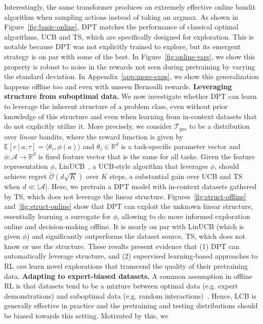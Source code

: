 \documentclass{article}
\newcommand{\Acal}{\mathcal{A}}
\newcommand{\Ocal}{\mathcal{O}}
\newcommand{\Tcal}{{\mathcal{T}}}
\newcommand{\E}{\mathbb{E}}
\newcommand{\RR}{\mathbb{R}}
\newcommand{\dotp}[2]{\langle{#1},{#2}\rangle}
\newcommand{\pretraint}{\Tcal_{\text{pre}}}
\newcommand{\macroName}{DPT}
\begin{document}
Interestingly, the same transformer produces an extremely effective online bandit algorithm when sampling actions instead of taking an argmax. As shown in Figure~\ref{fig:basic-online}, DPT matches the performance of classical optimal algorithms, UCB and TS, which are specifically designed for exploration. This is notable because \macroName{} was not explicitly trained to explore, but its emergent strategy is on par with some of the best.  In Figure~\ref{fig:online-vars}, we show this property is robust to noise in the rewards not seen during pretraining by varying the standard deviation. In Appendix~\ref{app:more-exps}, we show this generalization happens offline too and even with unseen Bernoulli rewards.
\textbf{Leveraging structure from suboptimal data.} We now investigate whether \macroName{} can learn to leverage the inherent structure of a problem class, even without prior knowledge of this structure and even when learning from in-context datasets that do not explicitly utilize it. More precisely, we consider $\pretraint$ to be a distribution over \emph{linear} bandits, where the reward function is given by $\E\left[r \ | \ a, \tau \right] =  \dotp{\theta_\tau}{\phi(a)}$ and $\theta_\tau \in \RR^d$ is a task-specific parameter vector and $\phi: \Acal \to \RR^d$ is fixed feature vector that is the same for all tasks.
Given the feature representation $\phi$, LinUCB~\citep{abbasi2011improved}, a UCB-style algorithm that leverages $\phi$, should achieve regret $\widetilde{\Ocal}(d\sqrt{ K})$ over $K$ steps, a substantial gain over UCB and TS when $d \ll |\Acal|$.
Here, we pretrain a \macroName{} model with in-context datasets gathered by TS, which does not leverage the linear structure. Figures~\ref{fig:struct-offline} and~\ref{fig:struct-online} show that \macroName{} can exploit the unknown linear structure, essentially learning a surrogate for $\phi$, allowing to do more informed exploration online and decision-making offline.
It is nearly on par with LinUCB (which is given $\phi$) and significantly outperforms the dataset source, TS, which does not know or use the structure. These results present evidence that (1) \macroName{} can automatically leverage structure, and (2) supervised learning-based approaches to RL \emph{can} learn novel explorations that transcend the quality of their pretraining data.
\textbf{Adapting to expert-biased datasets.}
A common assumption in offline RL is that datasets tend to be a mixture between optimal data (e.g. expert demonstrations) and suboptimal data (e.g. random interactions)~\citep{rashidinejad2021bridging}. Hence, LCB is generally effective in practice and the pretraining and testing distributions should be biased towards this setting. Motivated by this, we
\end{document}
